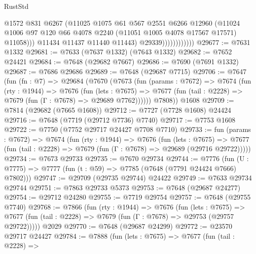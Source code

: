 \begin{lexlean}{RustStd}
\begin{coremodule}
{\begin{coremodule}
{{{{{{{{{{{{{{{{{{{{{{{{{{{{{{{{{{{{{{{{{{{{{{{{{{{{{                                @1572
                                @831
                                @6267
                                (@11025
                                  @1075
                                  @61
                                  @567
                                  @2551
                                  @6266
                                  @12960
                                  (@11024
                                    @1006
                                    @97
                                    @120
                                    @66
                                    @4078
                                    @2240
                                    (@11051 @1005 @4078 @17567 @17571)
                                    @11058)))
                              @11434
                              @11437
                              @11440
                              @11443)
                            @29339))))))))))))
@29677 := @7631 @1332
@29681 := @7633 (@7637 @1332) (@7643 @1332)
@29682 := @7652 @24421
@29684 := @7648 (@29682 @7667)
@29686 := @7690 (@7691 @1332)
@29687 := @7686 @29686
@29689 := @7648 (@29687 @7715)
@29706 := @7647
    (fun (fn : @7) =>
    @29684
      (@7670
        (@7673
          (fun (params : @7672) =>
          @7674
            (fun (rty : @1944) =>
            @7676
              (fun (lets : @7675) =>
              @7677 (fun (tail : @2228) => @7679 (fun (Γ : @7678) => @29689 @7762))))))
        @7808))
    @1608
@29709 := @7814 (@29682 (@7665 @1608))
@29712 := @7727 (@7728 @1608) @24424
@29716 := @7648 (@7719 (@29712 @7736) @7740)
@29717 := @7753 @1608
@29722 := @7750 (@7752 @29717 @24427 @7708 @7710)
@29733 := fun (params : @7672) =>
  @7674
    (fun (rty : @1944) =>
    @7676
      (fun (lets : @7675) =>
      @7677 (fun (tail : @2228) => @7679 (fun (Γ : @7678) => @29689 (@29716 @29722)))))
@29734 := @7673 @29733
@29735 := @7670 @29734
@29744 := @7776
    (fun (U : @7775) => @7777 (fun (t : @59) => @7785 (@7648 (@7791 @24424 @7666) @7802)))
@29747 := @29709 (@29735 @29744) @24422
@29749 := @7633 @29734 @29744
@29751 := @7863 @29733 @5373
@29753 := @7648 (@29687 @24277)
@29754 := @29712 @24280
@29755 := @7719 @29754
@29757 := @7648 (@29755 @7740)
@29768 := @7866
    (fun (rty : @1944) =>
    @7676
      (fun (lets : @7675) =>
      @7677 (fun (tail : @2228) => @7679 (fun (Γ : @7678) => @29753 (@29757 @29722)))))
    @2029
@29770 := @7648 (@29687 @24299)
@29772 := @23570 @29717 @24427
@29784 := @7888
    (fun (lets : @7675) =>
    @7677
      (fun (tail : @2228) =>
}}}}}}}}}}}}}}}}}}}}}}}}}}}}}}}}}}}}}}}}}}}}}}}}}}}}}
\end{coremodule}}
\end{coremodule}
\end{lexlean}
